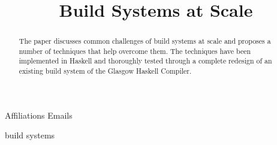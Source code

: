 \documentclass[preprint]{sigplanconf}
\begin{document}
\setlength{\pdfpageheight}{\paperheight}
\setlength{\pdfpagewidth}{\paperwidth}


\title{Build Systems at Scale}

           {Affiliations}
           {Emails}

\maketitle

\begin{abstract}
The paper discusses common challenges of build systems at scale and proposes a
number of techniques that help overcome them. The techniques have been
implemented in Haskell and thoroughly tested through a complete redesign of an
existing build system of the Glasgow Haskell Compiler.
\end{abstract}

\keywords
build systems










%


\begin{thebibliography}{}
\softraggedright


\end{thebibliography}
\end{document}
